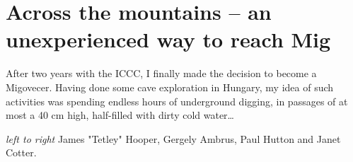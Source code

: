 \section{Across the mountains -- an unexperienced way to reach
Mig}

After two years with the ICCC, I finally made the decision to become a
Migovecer. Having done some cave exploration in Hungary, my idea of such
activities was spending endless hours of underground digging, in
passages of at most a 40 cm high, half-filled with dirty cold
water\ldots{}

\begin{marginfigure}
\checkoddpage \ifoddpage \forcerectofloat \else \forceversofloat \fi
\centering
 \caption{\textit{left to right} James "Tetley" Hooper, Gergely Ambrus, Paul Hutton and Janet Cotter. }
 \label{group 2008}
\end{marginfigure}

